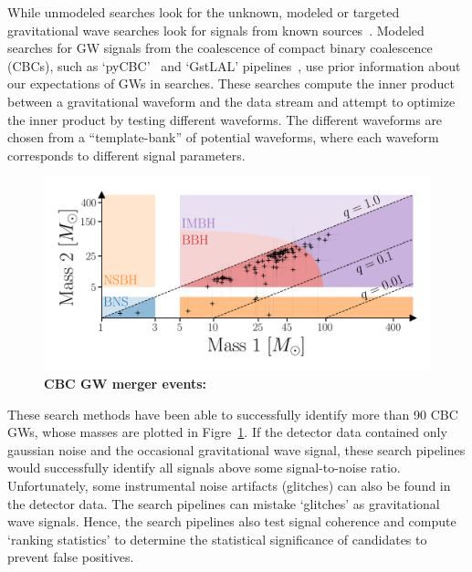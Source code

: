 While unmodeled searches look for the unknown,  modeled or targeted gravitational wave searches look for signals from known sources~\cite{abbott2016ligo}. 
Modeled searches for GW signals from the coalescence of compact binary coalescence (CBCs), such as `pyCBC'~\cite{biwer2019pycbc} and
`GstLAL' pipelines~\cite{sachdev2019gstlal},  use prior information about our expectations of GWs in searches. These searches compute the inner product between a gravitational waveform and the data stream and attempt to optimize the inner product by testing different waveforms. 
The different waveforms are chosen from a ``template-bank'' of potential waveforms, where each waveform corresponds to different signal parameters. 


\begin{figure}
\begin{center}
  \centerline{\includegraphics[width=1.1\linewidth]{src/figures/gw_catalog.png}}
  \caption{\textbf{CBC GW merger events:}  }
  \label{fig:cbc_mergers}
\end{center}
\end{figure}


These search methods have been able to successfully identify more than 90 CBC GWs, whose masses are plotted in Figre~\ref{fig:cbc_mergers}.
If the detector data contained only gaussian noise and the occasional gravitational wave signal, these search pipelines would successfully identify all signals above some signal-to-noise ratio. 
Unfortunately, some instrumental noise artifacts (glitches) can also be found in the detector data. 
The search pipelines can mistake `glitches' as gravitational wave signals. 
Hence, the search pipelines also test signal coherence and compute `ranking statistics' to determine the statistical significance of candidates to prevent false positives. 

